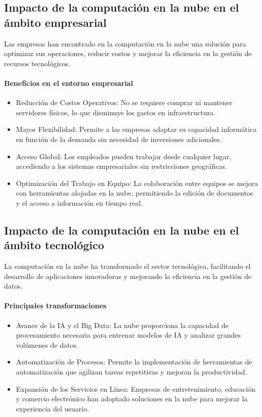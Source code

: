 {        \subsection[Impacto en el {\'a}mbito empresarial]{Impacto de la computaci{\'o}n en la nube en el {\'a}mbito empresarial}
            Las empresas han encontrado en la computaci{\'o}n en la nube una soluci{\'o}n para optimizar sus operaciones, reducir costos y mejorar la eficiencia en la gesti{\'o}n de recursos tecnol{\'o}gicos.
            
            \paragraph{Beneficios en el entorno empresarial}
            \begin{itemize}
                \item Reducci{\'o}n de Costos Operativos: No se requiere comprar ni mantener servidores f{\'i}sicos, lo que disminuye los gastos en infraestructura. 
                \item Mayor Flexibilidad: Permite a las empresas adaptar su capacidad inform{\'a}tica en funci{\'o}n de la demanda sin necesidad de inversiones adicionales.
                \item Acceso Global: Los empleados pueden trabajar desde cualquier lugar, accediendo a los sistemas empresariales sin restricciones geogr{\'a}ficas.
                \item Optimizaci{\'o}n del Trabajo en Equipo: La colaboraci{\'o}n entre equipos se mejora con herramientas alojadas en la nube, permitiendo la edici{\'o}n de documentos y el acceso a informaci{\'o}n en tiempo real.
            \end{itemize}
        \subsection[Impacto en el {\'a}mbito tecnol{\'o}gico]{Impacto de la computaci{\'o}n en la nube en el {\'a}mbito tecnol{\'o}gico}
            La computaci{\'o}n en la nube ha transformado el sector tecnol{\'o}gico, facilitando el desarrollo de aplicaciones innovadoras y mejorando la eficiencia en la gesti{\'o}n de datos.
            
            \paragraph{Principales transformaciones}
            \begin{itemize}
                \item Avance de la IA y el Big Data: La nube proporciona la capacidad de procesamiento necesaria para entrenar modelos de IA y analizar grandes vol{\'u}menes de datos.
                \item Automatizaci{\'o}n de Procesos: Permite la implementaci{\'o}n de herramientas de automatizaci{\'o}n que agilizan tareas repetitivas y mejoran la productividad.
                \item Expansi{\'o}n de los Servicios en L{\'i}nea: Empresas de entretenimiento, educaci{\'o}n y comercio electr{\'o}nico han adoptado soluciones en la nube para mejorar la experiencia del usuario.
            \end{itemize}
}
